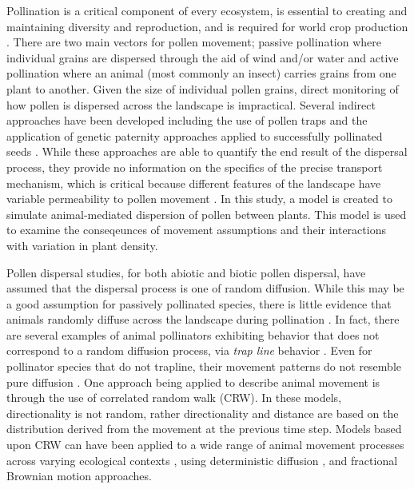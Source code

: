 Pollination is a critical component of every ecosystem, is essential to creating
and maintaining diversity and reproduction, and is required for world crop
production \cite{KleinEtAl2007}.  There are two main vectors for pollen
movement; passive pollination where individual grains are dispersed through the
aid of wind and/or water and active pollination where an animal (most commonly
an insect) carries grains from one plant to another.  Given the size of
individual pollen grains, direct monitoring of how pollen is dispersed across
the landscape is impractical.  Several indirect approaches have been developed
including the use of pollen traps and the application of genetic paternity
approaches applied to successfully pollinated seeds
\cite{BitzerPatterson1967,StreiffEtAl1999}.  While these approaches are able to
quantify the end result of the dispersal process, they provide no information on
the specifics of the precise transport mechanism, which is critical because
different features of the landscape have variable permeability to pollen
movement \cite{DyerSork2001,DyerEtAl2012}. In this study, a model is created to
simulate animal-mediated dispersion of pollen between plants.  This model is
used to examine the conseqeunces of movement assumptions and their interactions
with variation in plant density.

Pollen dispersal studies, for both abiotic and biotic pollen dispersal, have
assumed that the dispersal process is one of random diffusion.  While this may
be a good assumption for passively pollinated species, there is little evidence
that animals randomly diffuse across the landscape during pollination
\cite{LevinKerster}.  In fact, there are several examples of animal pollinators
exhibiting behavior that does not correspond to a random diffusion process, via
\emph{trap line} behavior \cite[e.g., repeated sequential visits to individual
plants]{OhashiThomson}.  Even for pollinator species that do not trapline, their
movement patterns do not resemble pure diffusion \cite{Cresswell03}. One
approach being applied to describe animal movement is through the use of
correlated random walk (CRW).  In these models, directionality is not random,
rather directionality and distance are based on the distribution derived from
the movement at the previous time step.  Models based upon CRW can have been
applied to a wide range of animal movement processes across varying ecological
contexts \cite{Bartumeus07,Byers01}, using deterministic diffusion
\cite{Klages}, and fractional Brownian motion \cite{Enriquez} approaches.

